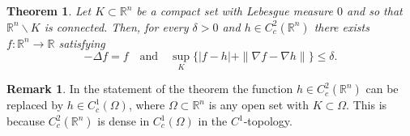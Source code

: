 \documentclass[11pt,reqno]{amsart}
\newcommand{\R}{{\mathbb R}}
\newtheorem{theorem}{Theorem}
\theoremstyle{definition}
\newtheorem{remark}{Remark}
\begin{document}
\begin{theorem}\label{T:perturbation}
Let $K \subset \R^n$  be a compact set with  Lebesgue measure $0$ and  so that $\R^n \backslash K$ is connected.   Then, for every $\delta>0$ and $h\in C_c^2(\R^n)$  there exists $f:\R^n \to \R$ satisfying 
\[-\Delta f=f  \quad \text{and} \quad   \sup_{ K}\{|f-h|+ \|\nabla f-\nabla h\|\} \leq \delta.\] 
\end{theorem}
\begin{remark}
In the statement of the theorem the function $h\in C_c^2(\R^n)$ can be replaced by $h\in C_c^1(\Omega)$, where $\Omega \subset \R^n$ is any open set with $K \subset \Omega$. This is because $C_c^2(\R^n)$ is dense in  $C_c^1(\Omega)$ in the $C^1$-topology.
\end{remark}
\end{document}
